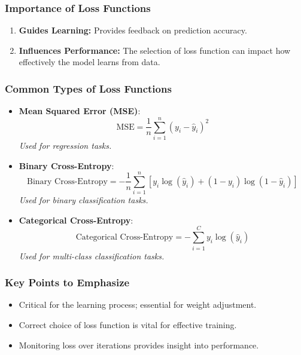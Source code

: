 \documentclass[aspectratio=169]{beamer}
\begin{document}
\begin{frame}[fragile]
    \frametitle{Importance of Loss Functions}
    \begin{enumerate}
        \item \textbf{Guides Learning:} Provides feedback on prediction accuracy.
        \item \textbf{Influences Performance:} The selection of loss function can impact how effectively the model learns from data.
    \end{enumerate}
\end{frame}

\begin{frame}[fragile]
    \frametitle{Common Types of Loss Functions}
    \begin{itemize}
        \item \textbf{Mean Squared Error (MSE)}: 
        \begin{equation}
            \text{MSE} = \frac{1}{n} \sum_{i=1}^{n} (y_i - \hat{y}_i)^2
        \end{equation}
        \textit{Used for regression tasks.}
        
        \item \textbf{Binary Cross-Entropy}:
        \begin{equation}
            \text{Binary Cross-Entropy} = -\frac{1}{n} \sum_{i=1}^{n} [y_i \log(\hat{y}_i) + (1-y_i) \log(1-\hat{y}_i)]
        \end{equation}
        \textit{Used for binary classification tasks.}
        
        \item \textbf{Categorical Cross-Entropy}:
        \begin{equation}
            \text{Categorical Cross-Entropy} = -\sum_{i=1}^{C} y_i \log(\hat{y}_i)
        \end{equation}
        \textit{Used for multi-class classification tasks.}
    \end{itemize}
\end{frame}

\begin{frame}[fragile]
    \frametitle{Key Points to Emphasize}
    \begin{itemize}
        \item Critical for the learning process; essential for weight adjustment.
        \item Correct choice of loss function is vital for effective training.
        \item Monitoring loss over iterations provides insight into performance.
    \end{itemize}
\end{frame}
\end{document}
